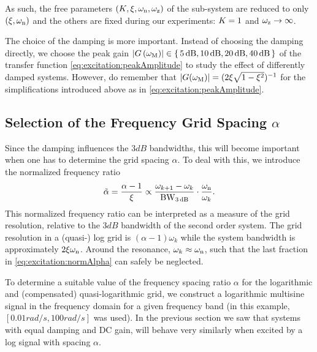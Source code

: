   As such, the free parameters $(K_{}, \xi_{}, \omega_{\mathrm{n}}, \omega_{\mathrm{z}})$ of the sub-system are reduced to only $(\xi_{}, \omega_{\mathrm{n}})$ and the others are fixed during our experiments: $K_{} = 1$ and $\omega_{\mathrm{z}} \to \infty$.


  The choice of the damping is more important.
  Instead of choosing the damping directly, we choose the peak gain $\left|  G\left( \omega_{\mathrm{M}} \right)  \right| \in \set{5 \ensuremath{\,\mathrm{dB}}, 10 \ensuremath{\,\mathrm{dB}}, 20 \ensuremath{\,\mathrm{dB}}, 40 \ensuremath{\,\mathrm{dB}} }$ of the transfer function \eqref{eq:excitation:peakAmplitude} to study the effect of differently damped systems.
  However, do remember that $\left| G(\omega_{\mathrm{M}}) \right| = (2\xi_{}\sqrt{1-\xi_{}^2})^{-1}$ for the simplifications introduced above as in \eqref{eq:excitation:peakAmplitude}.

  \subsection{Selection of the Frequency Grid Spacing $\alpha$}
  Since the damping influences the $3\unit{dB}$ bandwidths, this will become important when one has to determine the grid spacing $\alpha$.
  To deal with this, we introduce the normalized frequency ratio
  \begin{equation}
    \tilde{\alpha} = \frac{\alpha - 1}
                          {\xi_{}}
                   \propto \frac{\omega_{k+1} - \omega_k}
                                {\mathrm{BW}_{3\,\mathrm{dB}}}
                           \cdot
                           \frac{\omega_{\mathrm{n}}}{\omega_k}
    \text{.}
    \label{eq:excitation:normAlpha} 
  \end{equation}
  This normalized frequency ratio can be interpreted as a measure of the grid resolution, relative to the $3\unit{dB}$ bandwidth of the second order system.
  The grid resolution in a (quasi-) log grid is $\left( \alpha - 1\right)\omega_k$ while the system bandwidth is approximately $2\xi_{}\omega_{\mathrm{n}}$.
  Around the resonance, $\omega_k \approx \omega_{\mathrm{n}}$, such that the last fraction in \eqref{eq:excitation:normAlpha} can safely be neglected.
  
  To determine a suitable value of the frequency spacing ratio $\alpha$ for the logarithmic and (compensated) quasi-logarithmic grid, we construct a logarithmic multisine signal in the frequency domain for a given frequency band (in this example, $\left[ 0.01 \unit{rad/s}, 100 \unit{rad/s}\right]$ was used).
  In the previous section we saw that systems with equal damping and \gls{DC} gain, will behave very similarly when excited by a log signal with spacing $\alpha$.

